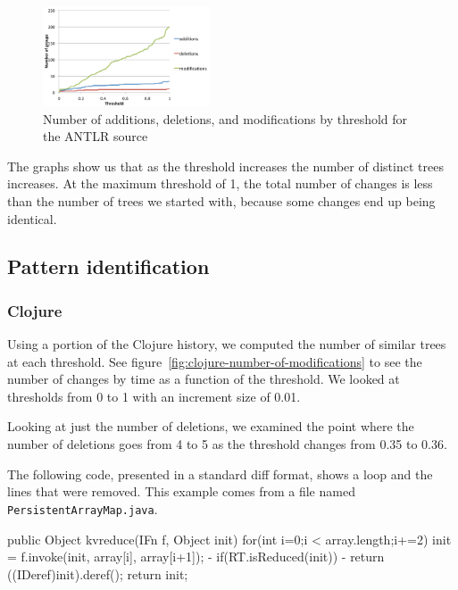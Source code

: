 \begin{figure}
\begin{center}
\includegraphics[width=0.44\textwidth]{figures/antlr-number-of-modifications.pdf}
\caption{Number of additions, deletions, and modifications by threshold for the ANTLR source}
\label{fig:antlr-number-of-modifications}
\end{center}
\end{figure}

The graphs show us that as the threshold increases the number of distinct trees
increases. At the maximum threshold of 1, the total number of changes is less
than the number of trees we started with, because some changes end up being
identical.

\subsection{Pattern identification}

\subsubsection{Clojure}
\label{sec:clojure}

Using a portion of the Clojure history, we computed the number of similar trees
at each threshold. See figure~\ref{fig:clojure-number-of-modifications} to see
the number of changes by time as a function of the threshold. We looked at
thresholds from 0 to 1 with an increment size of 0.01.

Looking at just the number of deletions, we examined the point where the number
of deletions goes from 4 to 5 as the threshold changes from 0.35 to 0.36.

The following code, presented in a standard diff format, shows a loop and the
lines that were removed. This example comes from a file named {\tt
PersistentArrayMap.java}.

\begin{java}
 public Object kvreduce(IFn f, Object init){
     for(int i=0;i < array.length;i+=2){
         init = f.invoke(init, array[i], array[i+1]);
-           if(RT.isReduced(init))
-                   return ((IDeref)init).deref();
         }
     return init;
 }
\end{java}

